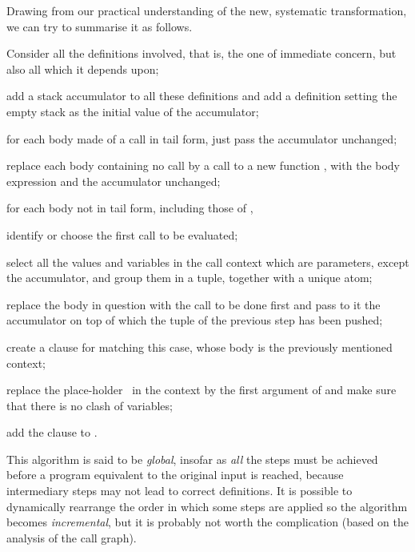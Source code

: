
Drawing from our practical understanding of the new, systematic
transformation, we can try to summarise it as follows.
\begin{enumerate*}

  \item Consider all the definitions involved, that is, the one of
    immediate concern, but also all which it depends upon;

  \item add a stack accumulator to all these definitions and add a
    definition setting the empty stack as the initial value of the
    accumulator;

  \item for each body made of a call in tail form, just pass the
    accumulator unchanged;

  \item replace each body containing no call by a call to a new
    function , with the body expression and the
    accumulator unchanged;

  \item for each body not in tail form, including those
    of ,
    \begin{enumerate*}

      \item identify or choose the first call to be evaluated;

      \item select all the values and variables in the call context
        which are parameters, except the accumulator, and group them
        in a tuple, together with a unique atom;

      \item replace the body in question with the call to be done
        first and pass to it the accumulator on top of which the tuple
        of the previous step has been pushed;

      \item \label{add_appk1} create a clause for 
        matching this case, whose body is the previously mentioned
        context;

      \item \label{add_appk2} replace the
        place\hyp{}holder~\erlcode{\textvisiblespace} in the context
        by the first argument of  and make sure that
        there is no clash of variables;

    \end{enumerate*}

  \item add the clause  to .

\end{enumerate*}
This algorithm is said to be \emph{global}, insofar as \emph{all} the steps must be achieved before a program equivalent to the original input is reached, because intermediary steps may not lead to correct definitions. It is possible to dynamically rearrange the order in which some steps are applied so the algorithm becomes \emph{incremental}, but it is probably not worth the complication (based on the analysis of the call graph).

